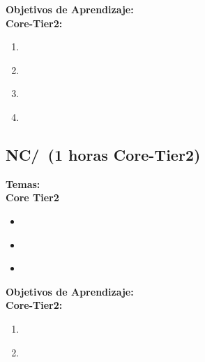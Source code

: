 \noindent \textbf{Objetivos de Aprendizaje:}\\
\noindent \textbf{Core-Tier2:}
\begin{enumerate}
	\setcounter{enumi}{0}
	\item \NCResourceAllocationLODescribeHowBe\xspace[\NCResourceAllocationLODescribeHowBeLevel]\label{sec:BOK:NCResourceAllocationLODescribeHowBe}
	\item \NCResourceAllocationLODescribeTheInNetwork\xspace[\NCResourceAllocationLODescribeTheInNetworkLevel]\label{sec:BOK:NCResourceAllocationLODescribeTheInNetwork}
	\item \NCResourceAllocationLOCompareAndAnd\xspace[\NCResourceAllocationLOCompareAndAndLevel]\label{sec:BOK:NCResourceAllocationLOCompareAndAnd}
	\item \NCResourceAllocationLOCompareAndApproaches\xspace[\NCResourceAllocationLOCompareAndApproachesLevel]\label{sec:BOK:NCResourceAllocationLOCompareAndApproaches}
\end{enumerate}


\subsection{NC/\NCMobility~(1 horas Core-Tier2)}\label{sec:BOK:NCMobility}
\noindent \textbf{Temas:}\\
\noindent \textbf{Core Tier2}
\begin{itemize}
	\item \NCMobilityTopicPrinciplesOf\label{sec:BOK:NCMobilityTopicPrinciplesOf}
	\item \NCMobilityTopicEight\label{sec:BOK:NCMobilityTopicEight}
	\item \NCMobilityTopicIssues\label{sec:BOK:NCMobilityTopicIssues}
\end{itemize}


\noindent \textbf{Objetivos de Aprendizaje:}\\
\noindent \textbf{Core-Tier2:}
\begin{enumerate}
	\setcounter{enumi}{0}
	\item \NCMobilityLODescribeTheA\xspace[\NCMobilityLODescribeTheALevel]\label{sec:BOK:NCMobilityLODescribeTheA}
	\item \NCMobilityLODescribeHowSupport\xspace[\NCMobilityLODescribeHowSupportLevel]\label{sec:BOK:NCMobilityLODescribeHowSupport}
\end{enumerate}


